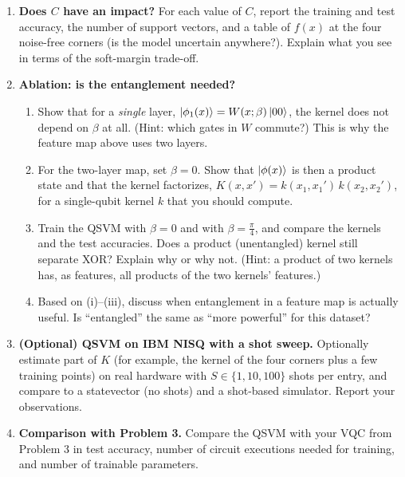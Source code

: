 \documentclass[11pt]{article}
\begin{document}
\begin{enumerate}[label=(\alph*)]
\medskip
\noindent\textbf{Decision function.} With $b$ in hand, compute the decision value and the predicted label
\[
f(x) \;=\; \sum_{i=1}^{N}\alpha_i\,y_i\,K(x_i,x) \;+\; b,
\qquad
\hat{y} \;=\; \mathrm{sign}\big(f(x)\big).
\]
$|f(x)|$ measures how confident the model is in its classification: if $|f(x)|$ is large the point is far from the decision boundary, and if it is small the point lies near the boundary and could be misclassified (it may actually belong to the other class). These ideas generalize readily to multi-class problems; here we start with the basics to get the idea, team \smiley{}.

\item \textbf{Does $C$ have an impact?} For each value of $C$, report the training and test accuracy, the number of support vectors, and a table of $f(x)$ at the four noise-free corners (is the model uncertain anywhere?). Explain what you see in terms of the soft-margin trade-off.

\item \textbf{Ablation: is the entanglement needed?}
\begin{enumerate}[label=(\roman*)]
\item Show that for a \emph{single} layer, $\ket{\phi_1(x)}=W(x;\beta)\ket{00}$, the kernel does not depend on $\beta$ at all. (Hint: which gates in $W$ commute?) This is why the feature map above uses two layers.
\item For the two-layer map, set $\beta=0$. Show that $\ket{\phi(x)}$ is then a product state and that the kernel factorizes, $K(x,x') = k(x_1,x_1')\,k(x_2,x_2')$, for a single-qubit kernel $k$ that you should compute.
\item Train the QSVM with $\beta=0$ and with $\beta=\tfrac{\pi}{4}$, and compare the kernels and the test accuracies. Does a product (unentangled) kernel still separate XOR? Explain why or why not. (Hint: a product of two kernels has, as features, all products of the two kernels' features.)
\item Based on (i)–(iii), discuss when entanglement in a feature map is actually useful. Is ``entangled'' the same as ``more powerful'' for this dataset?
\end{enumerate}

\item \textbf{(Optional) QSVM on IBM NISQ with a shot sweep.} Optionally estimate part of $K$ (for example, the kernel of the four corners plus a few training points) on real hardware with $S\in\{1,10,100\}$ shots per entry, and compare to a statevector (no shots) and a shot-based simulator. Report your observations.

\item \textbf{Comparison with Problem 3.} Compare the QSVM with your VQC from Problem 3 in test accuracy, number of circuit executions needed for training, and number of trainable parameters.
\end{enumerate}
\end{document}
